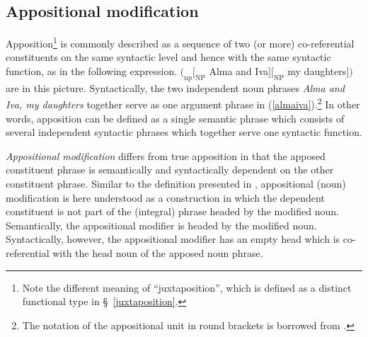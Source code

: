 \subsection{Appositional modification} \label{apposition}
Apposition\footnote{Note the different meaning of “juxtaposition”, which is defined as a distinct functional type in \S~\ref{juxtaposition}.} is commonly described as a sequence of two (or more) co-referential constituents on the same syntactic level and hence with the same syntactic function, as in the following expression.
\ea
$(_\textrm{np} [_\textrm{NP}$ Alma and Iva$] [_\textrm{NP}$ my daughters$] )$ are in this picture. \label{almaiva}
\z
Syntactically, the two independent noun phrases \textit{Alma and Iva, my daughters} together serve as one argument phrase in (\ref{almaiva}).\footnote{The notation of the appositional unit in round brackets is borrowed from \citet[21]{rijkhoff2002}.} In other words, apposition can be defined as a single semantic phrase which consists of several independent syntactic phrases which together serve one syntactic function.

\emph{Appositional modification} differs from true apposition in that the apposed constituent phrase is semantically and syntactically dependent on the other constituent phrase. Similar to the definition presented in \citet[22]{rijkhoff2002}, appositional (noun) modification is here understood as a construction in which the dependent constituent is not part of the (integral) phrase headed by the modified noun. Semantically, the appositional modifier is headed by the modified noun. Syntactically, however, the appositional modifier has an empty head which is co-referential with the head noun of the apposed noun phrase.

